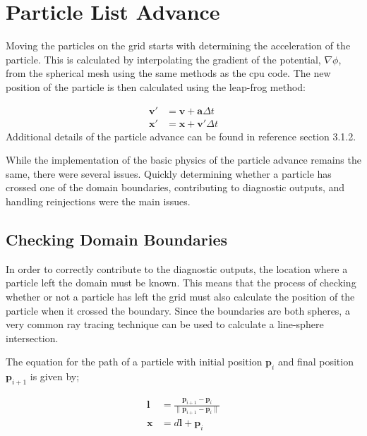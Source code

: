  
	\section{Particle List Advance}
	
Moving the particles on the grid starts with determining the acceleration of the particle. This is calculated by interpolating the gradient of the potential, $\nabla\phi$, from the spherical mesh using the same methods as the cpu code. The new position of the particle is then calculated using the leap-frog method:

\begin{equation}
\begin{aligned}
\mathbf{v}' &= \mathbf{v}+\mathbf{a}\Delta t \\
\mathbf{x}' &= \mathbf{x}+\mathbf{v}'\Delta t
\end{aligned}
\end{equation}
 Additional details of the particle advance can be found in reference \cite{Patacchini2007} section 3.1.2.
		
While the implementation of the basic physics of the particle advance remains the same, there were several issues. Quickly determining whether a particle has crossed one of the domain boundaries, contributing to diagnostic outputs, and handling reinjections were the main issues. 

		\subsection{Checking Domain Boundaries}
In order to correctly contribute to the diagnostic outputs, the location where a particle left the domain must be known. This means that the process of checking whether or not a particle has left the grid must also calculate the position of the particle when it crossed the boundary. Since the boundaries are both spheres, a very common ray tracing technique can be used to calculate a line-sphere intersection. 

The equation for the path of a particle with initial position $\mathbf{p}_i$ and final position $\mathbf{p}_{i+1}$ is given by;

\begin{equation}
\begin{aligned}
\mathbf{l} &= \frac{\mathbf{p}_{i+1} - \mathbf{p}_{i}}{\|\mathbf{p}_{i+1} - \mathbf{p}_{i}\|} \\
\mathbf{x} &= d\mathbf{l}+\mathbf{p}_{i}
\end{aligned}
\label{eqn:p_direction}
\end{equation}

